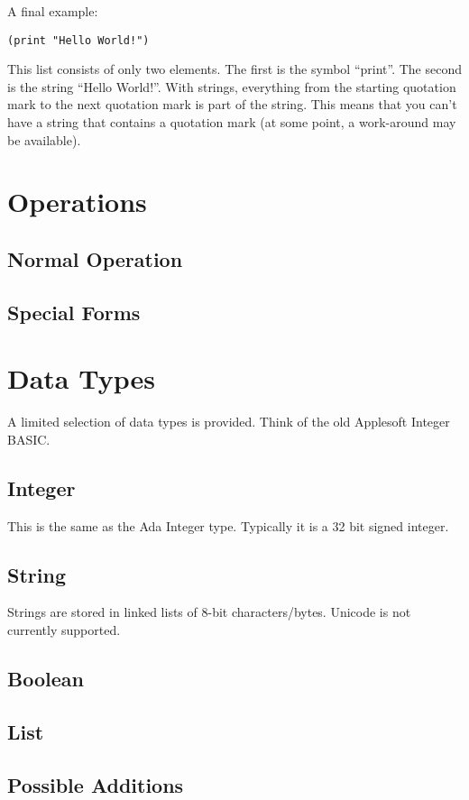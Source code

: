 \documentclass[10pt, openany]{book}
\begin{document}
A final example:
\begin{lstlisting}
(print "Hello World!")
\end{lstlisting}
This list consists of only two elements.  The first is the symbol ``print''.  The second is the string ``Hello World!''.  With strings, everything from the starting quotation mark to the next quotation mark is part of the string.  This means that you can't have a string that contains a quotation mark (at some point, a work-around may be available).

\section{Operations}
\subsection{Normal Operation}
\subsection{Special Forms}

\section{Data Types}
A limited selection of data types is provided.  Think of the old Applesoft Integer BASIC.

\subsection{Integer}
This is the same as the Ada Integer type.  Typically it is a 32 bit signed integer.

\subsection{String}
Strings are stored in linked lists of 8-bit characters/bytes.  Unicode is not currently supported.

\subsection{Boolean}
\subsection{List}
\subsection{Possible Additions}
\end{document}
